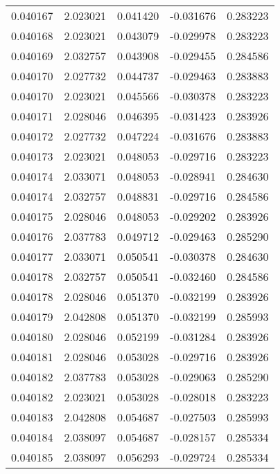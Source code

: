\begin{tabular}{lrrrr}
0.040167    &  2.023021 &  0.041420 & -0.031676 &             0.283223 \\
0.040168    &  2.023021 &  0.043079 & -0.029978 &             0.283223 \\
0.040169    &  2.032757 &  0.043908 & -0.029455 &             0.284586 \\
0.040170    &  2.027732 &  0.044737 & -0.029463 &             0.283883 \\
0.040170    &  2.023021 &  0.045566 & -0.030378 &             0.283223 \\
0.040171    &  2.028046 &  0.046395 & -0.031423 &             0.283926 \\
0.040172    &  2.027732 &  0.047224 & -0.031676 &             0.283883 \\
0.040173    &  2.023021 &  0.048053 & -0.029716 &             0.283223 \\
0.040174    &  2.033071 &  0.048053 & -0.028941 &             0.284630 \\
0.040174    &  2.032757 &  0.048831 & -0.029716 &             0.284586 \\
0.040175    &  2.028046 &  0.048053 & -0.029202 &             0.283926 \\
0.040176    &  2.037783 &  0.049712 & -0.029463 &             0.285290 \\
0.040177    &  2.033071 &  0.050541 & -0.030378 &             0.284630 \\
0.040178    &  2.032757 &  0.050541 & -0.032460 &             0.284586 \\
0.040178    &  2.028046 &  0.051370 & -0.032199 &             0.283926 \\
0.040179    &  2.042808 &  0.051370 & -0.032199 &             0.285993 \\
0.040180    &  2.028046 &  0.052199 & -0.031284 &             0.283926 \\
0.040181    &  2.028046 &  0.053028 & -0.029716 &             0.283926 \\
0.040182    &  2.037783 &  0.053028 & -0.029063 &             0.285290 \\
0.040182    &  2.023021 &  0.053028 & -0.028018 &             0.283223 \\
0.040183    &  2.042808 &  0.054687 & -0.027503 &             0.285993 \\
0.040184    &  2.038097 &  0.054687 & -0.028157 &             0.285334 \\
0.040185    &  2.038097 &  0.056293 & -0.029724 &             0.285334 \\

\end{tabular}
